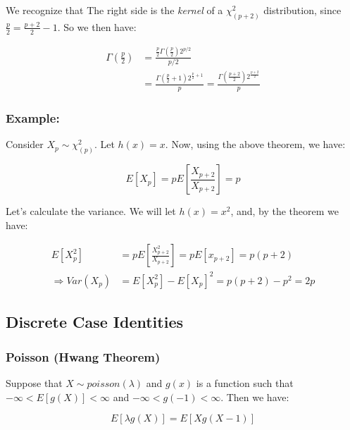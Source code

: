 \documentclass{article}
\begin{document}
We recognize that The right side is the \textit{kernel} of a $\chi^2_{(p+2)}$ distribution, since $\frac{p}{2} = \frac{p+2}{2} -1$. So we then have:

\begin{equation*}
    \begin{split}
        \Gamma\left(\frac{p}{2}\right) &= \frac{\frac{p}{2}\Gamma\left(\frac{p}{2}\right) 2^{p/2}}{p/2}\\
        &= \frac{\Gamma\left( \frac{p}{2}+1\right) 2^{\frac{p}{2} + 1}}{p} = \frac{\Gamma\left( \frac{p+2}{2}\right) 2^{\frac{p+2}{2}}}{p}
    \end{split}
\end{equation*}

\subsubsection*{Example:}

Consider $X_p \sim \chi^2_{(p)}$. Let $h(x) = x$. Now, using the above theorem, we have:

\begin{equation*}
    E[X_p] = p E\left[\frac{X_{p+2}}{X_{p+2}} \right] = p
\end{equation*}

Let's calculate the variance. We will let $h(x) = x^2$, and, by the theorem we have:

\begin{equation*}
    \begin{split}
        E[X_p^2] &= pE\left[\frac{X_{p+2}^2}{X_{p+2}} \right] = p E[x_{p+2}] = p(p+2)\\
        \Rightarrow Var(X_p) &= E[X_p^2] - E[X_p]^2 = p(p+2) - p^2 = 2p
    \end{split}
\end{equation*}

\subsection{Discrete Case Identities}

\subsubsection*{Poisson (Hwang Theorem)}

Suppose that $X \sim poisson(\lambda)$ and $g(x)$ is a function such that $-\infty < E[g(X)] < \infty$ and $-\infty < g(-1) < \infty$. Then we have:

\begin{equation*}
    E[\lambda g(X)] = E[X g(X-1)]
\end{equation*}
\end{document}
